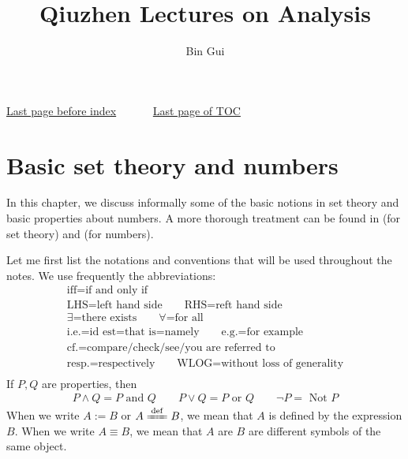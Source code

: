 \documentclass[12pt,b5paper,notitlepage]{article}
\title{Qiuzhen Lectures on Analysis}
\author{{\sc Bin Gui}
}
\theoremstyle{definition}
\theoremstyle{plain}
\numberwithin{equation}{section}
\begin{document}
\sloppy %
	\setcounter{page}{1}



	









	
	\maketitle
\small  \hyperlink{beforeindex}{Last page before index}~~~~~~   \hyperlink{page.4}{Last page of TOC}
\normalsize



\makeatletter
\newcommand*{\toccontents}{}
\makeatother
\toccontents

\hypertarget{endoftoc}{}

	


\newpage

\section{Basic set theory and numbers}


In this chapter, we discuss informally some of the basic notions in set theory and basic properties about numbers. A more thorough treatment can be found in \cite[Ch. 1]{Mun} (for set theory) and \cite[Ch. 1]{Rud-P} (for numbers). 

Let me first list the notations and conventions that will be used throughout the notes. We use frequently the abbreviations:
\begin{gather*}
\text{iff=if and only if}\\
\text{LHS=left hand side}\qquad
\text{RHS=reft hand side}\\
\text{$\exists$=there exists}\qquad \text{$\forall$=for all}\\
\text{i.e.=id est=that is=namely}\qquad\text{e.g.=for example}\\
\text{cf.=compare/check/see/you are referred to}\\
\text{resp.=respectively}\qquad 
\text{WLOG=without loss of generality}\\
\end{gather*}
If $P,Q$ are properties, then
\begin{align*}
P\land Q=P\text{ and }Q\qquad P\lor Q=P\text{ or }Q\qquad \neg P=\text{ Not }P
\end{align*}
When we write $A:=B$ or $A\xlongequal{\mathrm{def}}B$, we mean that $A$ is defined by the expression $B$. When we write $A\equiv B$, we mean that $A$ are $B$ are different symbols of the same object.
\end{document}
